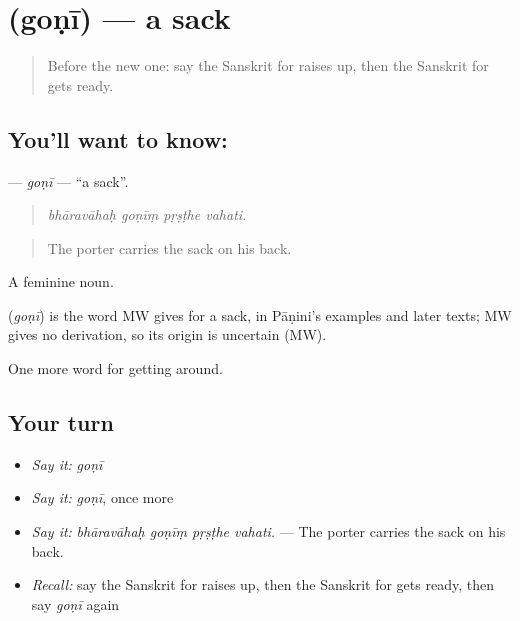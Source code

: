 \section[\texorpdfstring{\sk{गोणी} (goṇī)}{गोणी (goṇī)}]{ (goṇī) — a sack}

\label{lesson:SA-C413-goni}



\begin{quote}
Before the new one: say the Sanskrit for raises up, then the Sanskrit for gets ready.
\end{quote}

\subsection*{You'll want to know: }
\textbf{} — \emph{goṇī} — \textquotedblleft{}a sack\textquotedblright{}.

\begin{quote}
   
\end{quote}

\begin{quote}
\emph{bhāravāhaḥ goṇīṃ pṛṣṭhe vahati.}
\end{quote}

\begin{quote}
The porter carries the sack on his back.
\end{quote}

A feminine noun.

\begin{cousinweb}
\textbf{} (\emph{goṇī}) is the word MW gives for a sack, in Pāṇini's examples and later texts; MW gives no derivation, so its origin is uncertain (MW).
\end{cousinweb}

\begin{grammarlens}[title={What you've built}]
One more word for getting around.
\end{grammarlens}

\subsection*{Your turn}
\begin{itemize}
\raggedright
  \item \emph{Say it:} \emph{goṇī}
  \item \emph{Say it:} \emph{goṇī}, once more
  \item \emph{Say it:} \emph{bhāravāhaḥ goṇīṃ pṛṣṭhe vahati.} — The porter carries the sack on his back.
  \item \emph{Recall:} say the Sanskrit for raises up, then the Sanskrit for gets ready, then say \emph{goṇī} again
\end{itemize}

